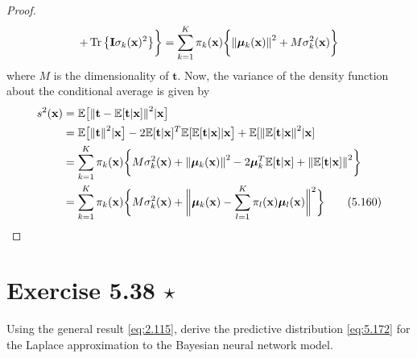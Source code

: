 \begin{proof}
\[            + \Tr\big\{\mathbf{I} \sigma_k(\mathbf{x})^2\big\}\bigg\}
        = \sum_{k=1}^{K} \pi_k(\mathbf{x})\bigg\{
            \norm{\bm{\mu}_k(\mathbf{x})}^2 + M\sigma_k^2(\mathbf{x})\bigg\}
    \] 
    where $M$ is the dimensionality of $\mathbf{t}$.
    Now, the variance of the density function about the conditional average is given by
    \begin{align*}
        s^2(\mathbf{x}) 
        &= \mathbb{E}\big[\norm{\mathbf{t} 
            - \mathbb{E}[\mathbf{t} | \mathbf{x}]}^2 | \mathbf{x}\big] \\
        &= \mathbb{E}\big[\norm{\mathbf{t}}^2 | \mathbf{x}\big] 
        - 2\mathbb{E}[\mathbf{t} | \mathbf{x}]^T 
            \mathbb{E}[\mathbb{E}[\mathbf{t} | \mathbf{x}] | \mathbf{x}\big]
            + \mathbb{E}[\norm{\mathbb{E}[\mathbf{t} | \mathbf{x}}^2 | \mathbf{x}] \\
        &= \sum_{k=1}^{K} \pi_k(\mathbf{x}) \bigg\{
            M\sigma_k^2(\mathbf{x}) + \norm{\bm{\mu}_k(\mathbf{x})}^2 
            - 2\bm{\mu}_k^T \mathbb{E}[\mathbf{t} | \mathbf{x}] 
            + \norm{\mathbb{E}[\mathbf{t} | \mathbf{x}]}^2\bigg\} \\
        &= \sum_{k=1}^{K} \pi_k(\mathbf{x}) \bigg\{
            M\sigma_k^2(\mathbf{x}) + 
            \bigg\Vert
            \bm{\mu}_k(\mathbf{x})
            - \sum_{l=1}^{K} \pi_l(\mathbf{x}) \bm{\mu}_l(\mathbf{x})\bigg\Vert^2\bigg\}
        \label{eq:5.160}\tag{5.160}
    \end{align*}
\end{proof}

\section*{Exercise 5.38 $\star$}
Using the general result \eqref{eq:2.115}, derive the predictive distribution
\eqref{eq:5.172} for the Laplace approximation to the Bayesian neural network model.

\vspace{1em}

